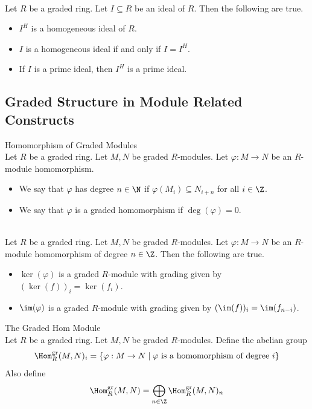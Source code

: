 \documentclass[a4paper]{article}
\begin{document}
\begin{lmm}{}{}\\
Let $R$ be a graded ring. Let $I\subseteq R$ be an ideal of $R$. Then the following are true. 
\begin{itemize}
\item $I^H$ is a homogeneous ideal of $R$. 
\item $I$ is a homogeneous ideal if and only if $I=I^H$. 
\item If $I$ is a prime ideal, then $I^H$ is a prime ideal. 
\end{itemize}
\end{lmm}

\subsection{Graded Structure in Module Related Constructs}
\begin{defn}{Homomorphism of Graded Modules}{}\\
Let $R$ be a graded ring. Let $M,N$ be graded $R$-modules. Let $\varphi:M\to N$ be an $R$-module homomorphism. 
\begin{itemize}
\item We say that $\varphi$ has degree $n\in\N$ if $\varphi(M_i)\subseteq N_{i+n}$ for all $i\in\Z$. 
\item We say that $\varphi$ is a graded homomorphism if $\deg(\varphi)=0$. 
\end{itemize}
\end{defn}

\begin{prp}{}{}\\
Let $R$ be a graded ring. Let $M,N$ be graded $R$-modules. Let $\varphi:M\to N$ be an $R$-module homomorphism of degree $n\in\Z$. Then the following are true. 
\begin{itemize}
\item $\ker(\varphi)$ is a graded $R$-module with grading given by $(\ker(f))_i=\ker(f_i)$. 
\item $\im(\varphi)$ is a graded $R$-module with grading given by $(\im(f))_i=\im(f_{n-i})$. 
\end{itemize}
\end{prp}

\begin{defn}{The Graded Hom Module}{}\\
Let $R$ be a graded ring. Let $M,N$ be graded $R$-modules. Define the abelian group $$\Hom_R^\text{gr}(M,N)_i=\{\varphi:M\to N\;|\;\varphi\text{ is a homomorphism of degree }i\}$$ Also define $$\Hom_R^\text{gr}(M,N)=\bigoplus_{n\in\Z}\Hom_R^\text{gr}(M,N)_n$$
\end{defn}
\end{document}
